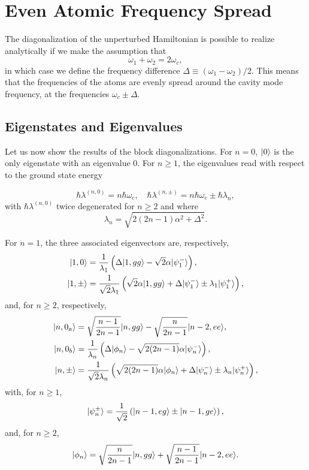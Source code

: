 \section{Even Atomic Frequency Spread}  \label{sec-delta}

The diagonalization of the unperturbed Hamiltonian is possible to realize analytically if we make the assumption that
\[ \omega_1 + \omega_2 = 2 \omega_c, \]
in which case we define the frequency difference $\Delta \equiv (\omega_1-\omega_2)/2$. This means that the frequencies of the atoms are evenly spread around the cavity mode frequency, at the frequencies $\omega_c \pm \Delta$.

\subsection{Eigenstates and Eigenvalues}

Let us now show the results of the block diagonalizations. For $n=0$, $| 0 \rangle$ is the only eigenstate with an eigenvalue 0. For $n \geq 1$, the eigenvalues read with respect to the ground state energy

\begin{equation}
\hbar \lambda^{(n,0)} = n \hbar \omega_c, \quad \hbar \lambda^{(n,\pm)} = n \hbar \omega_c \pm \hbar \lambda_n,
\end{equation}
with $\hbar \lambda^{(n,0)}$ twice degenerated for $n \geq 2$ and where
\begin{equation}
\lambda_n = \sqrt{ 2(2n-1) \alpha^2 + \Delta^2}.
\end{equation}

For $n=1$, the three associated eigenvectors are, respectively,
\begin{align}
| 1,0 \rangle & = \frac{1}{\lambda_1} \left( \Delta | 1,gg \rangle  - \sqrt{2} \alpha | \psi^-_1 \rangle \right),  \\
| 1,\pm \rangle & = \frac{1}{\sqrt{2} \lambda_1} \left(\sqrt 2 \alpha | 1,gg \rangle + \Delta | \psi^-_1 \rangle \pm \lambda_1 | \psi^+_1 \rangle \right) ,
\end{align}
and, for $n \geq 2$, respectively,
\begin{align}
| n,0_a \rangle &= \sqrt{\frac{n-1}{2n-1}} | n,gg \rangle - \sqrt{\frac{n}{2n-1}} | n-2,ee \rangle, \\
| n,0_b \rangle &= \frac{1}{\lambda_n} \left( \Delta | \phi_n \rangle  - \sqrt{2(2n-1)} \alpha | \psi^-_n \rangle \right),  \\
| n,\pm \rangle &=  \frac{1}{\sqrt 2 \lambda_n} \left( \sqrt{2(2n-1)} \alpha | \phi_n \rangle +  \Delta | \psi^-_n \rangle \pm \lambda_n | \psi^+_n \rangle \right),
\end{align}
with, for $n \geq 1$,
\begin{equation}
    | \psi^{\pm}_n \rangle = \frac{1}{\sqrt{2}} \left( | n-1,eg \rangle \pm | n-1,ge \rangle \right),
\end{equation}
and, for $n \geq 2$,
\begin{equation}
 | \phi_n \rangle = \sqrt{\frac{n}{2n-1}} | n,gg \rangle +\sqrt{\frac{n-1}{2n-1}} | n-2,ee \rangle. \\
\end{equation}

